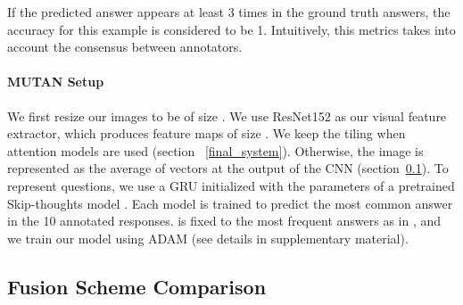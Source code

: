 \documentclass[10pt,twocolumn,letterpaper]{article}
\begin{document}
If the predicted answer appears at least 3 times in the ground truth answers, the accuracy for this example is considered to be 1. Intuitively, this metrics takes into account the consensus between annotators.


\paragraph{MUTAN Setup}
We first resize our images to be of size . We use ResNet152 \cite{He2015} as our visual feature extractor, 
which produces feature maps of size . 
We keep the  tiling when attention models are used (section ~\ref{final_system}). Otherwise, the image is represented as the average of  vectors at the output of the CNN (section~\ref{sec:compafusion}).
To represent questions, we use a GRU \cite{ChoMBB14} initialized with the parameters of a pretrained Skip-thoughts model \cite{Kiros2015}. 
Each model is trained to predict the most common answer in the 10 annotated responses.
 is fixed to the  most frequent answers as in \cite{Kim2017}, and we train our model using ADAM \cite{KingmaB14} (see details in supplementary material). 



\subsection{Fusion Scheme Comparison}
\label{sec:compafusion}
\end{document}
